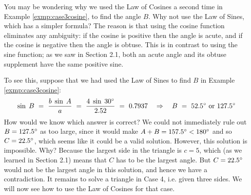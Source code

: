 You may be wondering why we used the Law of Cosines a second time in Example \ref{exmp:case3cosine},
to find the angle $B$. Why not use the Law of Sines, which has a simpler
formula?  The reason is that using the cosine function eliminates any ambiguity: if the cosine is
positive then the angle is acute, and if the cosine is negative then the angle is obtuse. This is in
contrast to using the sine function; as we saw in Section 2.1, both an acute angle and its obtuse
supplement have the same positive sine.

To see this, suppose that we had used the Law of Sines to find $B$ in Example
\ref{exmp:case3cosine}:
\begin{displaymath}
 \sin\;B ~=~ \frac{b\;\sin\;A}{a} ~=~ \frac{4\;\sin\;30^\circ}{2.52} ~=~ 0.7937
 \quad\Rightarrow\quad B ~=~ 52.5^\circ ~\text{or}~ 127.5^\circ
\end{displaymath}
How would we know which answer is correct? We could not immediately rule out $B = 127.5^\circ$ as
too large, since it would make $A + B = 157.5^\circ < 180^\circ$ and so $C = 22.5^\circ$,
which seems like it could be a valid solution. However, this solution is impossible. Why? Because
the largest side in the triangle is $c = 5$, which (as we learned in Section 2.1)
means that $C$ has to be the largest angle. But $C = 22.5^\circ$ would not be the largest angle
in this solution, and hence we have a contradiction.
\newpage
It remains to solve a triangle in Case 4, i.e. given three sides. We will now see how to use the
Law of Cosines for that case.


